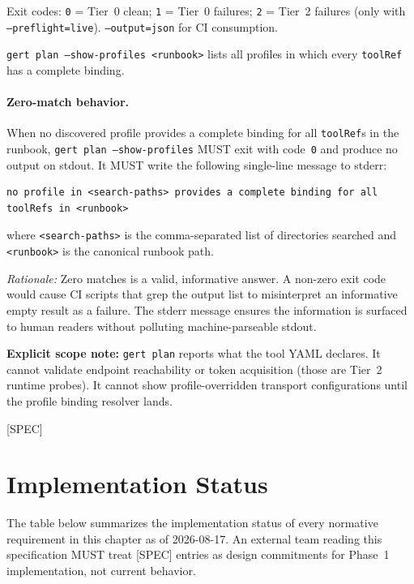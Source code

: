 Exit codes: \texttt{0} = Tier~0 clean; \texttt{1} = Tier~0 failures;
\texttt{2} = Tier~2 failures (only with \texttt{--preflight=live}).
\texttt{--output=json} for CI consumption.

\texttt{gert plan --show-profiles <runbook>} lists all profiles in which
every \texttt{toolRef} has a complete binding.

\paragraph{Zero-match behavior.}  When no discovered profile provides a
complete binding for all \texttt{toolRef}s in the runbook,
\texttt{gert plan --show-profiles} MUST exit with code~\texttt{0} and
produce no output on stdout.  It MUST write the following single-line
message to stderr:

\begin{verbatim}
no profile in <search-paths> provides a complete binding for all
toolRefs in <runbook>
\end{verbatim}

where \texttt{<search-paths>} is the comma-separated list of directories
searched and \texttt{<runbook>} is the canonical runbook path.

\textit{Rationale:} Zero matches is a valid, informative answer.  A
non-zero exit code would cause CI scripts that grep the output list to
misinterpret an informative empty result as a failure.  The stderr message
ensures the information is surfaced to human readers without polluting
machine-parseable stdout.

\textbf{Explicit scope note:} \texttt{gert plan} reports what the tool YAML
declares.  It cannot validate endpoint reachability or token acquisition (those
are Tier~2 runtime probes).  It cannot show profile-overridden transport
configurations until the profile binding resolver lands.

[SPEC]

\section{Implementation Status}
\label{sec:rp-impl-status}

The table below summarizes the implementation status of every normative
requirement in this chapter as of 2026-08-17.  An external team reading this
specification MUST treat [SPEC] entries as design commitments for Phase~1
implementation, not current behavior.

